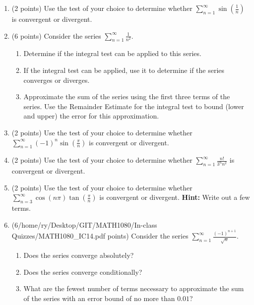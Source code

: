 \documentclass[paper=a4, fontsize=11pt]{scrartcl} %
\numberwithin{equation}{section} %
\numberwithin{figure}{section} %
\numberwithin{table}{section} %
\begin{document}
\begin{enumerate}
\item (2 points) Use the test of your choice to determine whether 
$\sum\limits_{n=1}^\infty \sin \left( \frac{1}{n} \right)$ is convergent or divergent.

\newpage

\item (6 points) Consider the series $\sum\limits_{n=1}^\infty \frac{1}{n^2}$.
\begin{enumerate}
\item Determine if the integral test can be applied to this series.
\vspace{3.5in}
\item If the integral test can be applied, use it to determine if the series converges or diverges.
\newpage
\item Approximate the sum of the series using the first three terms of the series. Use the Remainder Estimate for the integral test to bound (lower and upper) the error for this approximation.
\end{enumerate}

\vspace{3.5in}

\item (2 points) Use the test of your choice to determine whether 
$\sum\limits_{n=1}^\infty (-1)^n \sin \left( \frac{\pi}{n} \right)$ is convergent or divergent.

\newpage

\item (2 points) Use the test of your choice to determine whether 
$\sum\limits_{n=1}^\infty \frac{n!}{3^n n^2}$ is convergent or divergent.

\newpage

\item (2 points) Use the test of your choice to determine whether 
$\sum\limits_{n=3}^\infty \cos (n \pi) \tan (\frac{\pi}{n})$ is convergent or divergent. \textbf{Hint:} Write out a few terms.

\newpage

\item (6/home/ry/Desktop/GIT/MATH1080/In-class Quizzes/MATH1080_IC14.pdf points) Consider the series $\sum\limits_{n=1}^\infty \frac{(-1)^{n+1}}{\sqrt{n}}$.
\begin{enumerate}
\item Does the series converge absolutely?
 \vspace{2in}
\item Does the series converge conditionally?
 \vspace{3in}
\item What are the fewest number of terms necessary to approximate the sum of the series with an error bound of no more than $0.01$?
\end{enumerate}



\end{enumerate}

\end{document}
